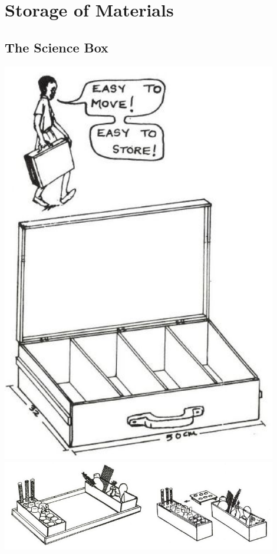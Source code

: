 \chapter{Storage of Materials}


\section{The Science Box}

\begin{center}
\includegraphics[width=12cm]{./img/source/science-box.jpg}
\includegraphics[width=12cm]{./img/source/science-tray.jpg}
\end{center}


